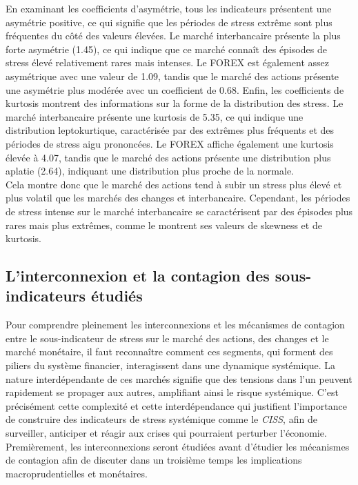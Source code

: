 \begin{sloppypar}
En examinant les coefficients d'asymétrie, tous les indicateurs présentent une asymétrie positive, ce qui signifie que les périodes de stress extrême sont plus fréquentes du côté des valeurs élevées. Le marché interbancaire présente la plus forte asymétrie (1.45), ce qui indique que ce marché connaît des épisodes de stress élevé relativement rares mais intenses. Le FOREX est également assez asymétrique avec une valeur de 1.09, tandis que le marché des actions présente une asymétrie plus modérée avec un coefficient de 0.68. Enfin, les coefficients de kurtosis montrent des informations sur la forme de la distribution des stress. Le marché interbancaire présente une kurtosis de 5.35, ce qui indique une distribution leptokurtique, caractérisée par des extrêmes plus fréquents et des périodes de stress aigu prononcées. Le FOREX affiche également une kurtosis élevée à 4.07, tandis que le marché des actions présente une distribution plus aplatie (2.64), indiquant une distribution plus proche de la normale.\\

Cela montre donc que le marché des actions tend à subir un stress plus élevé et plus volatil que les marchés des changes et interbancaire. Cependant, les périodes de stress intense sur le marché interbancaire se caractérisent par des épisodes plus rares mais plus extrêmes, comme le montrent ses valeurs de skewness et de kurtosis.

\subsection{L'interconnexion et la contagion des sous-indicateurs étudiés}

Pour comprendre pleinement les interconnexions et les mécanismes de contagion entre le sous-indicateur de stress sur le marché des actions, des changes et le marché monétaire, il faut  reconnaître comment ces segments, qui forment des piliers du système financier, interagissent dans une dynamique systémique. La nature interdépendante de ces marchés signifie que des tensions dans l’un peuvent rapidement se propager aux autres, amplifiant ainsi le risque systémique. C’est précisément cette complexité et cette interdépendance qui justifient l’importance de construire des indicateurs de stress systémique comme le \textit{CISS}, afin de surveiller, anticiper et réagir aux crises qui pourraient perturber l’économie.\\

Premièrement, les interconnexions seront étudiées avant d'étudier les mécanismes de contagion afin de discuter dans un troisième temps les implications macroprudentielles et monétaires.\\


\end{sloppypar}
